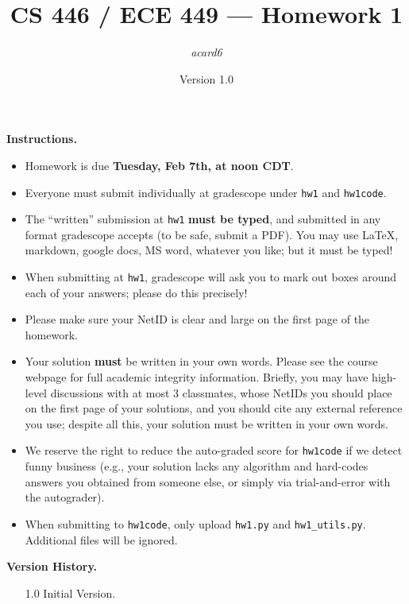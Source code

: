 \documentclass{article}
\title{CS 446 / ECE 449 --- Homework 1}
\author{\emph{acard6}}
\date{Version 1.0}
\theoremstyle{definition}
\theoremstyle{remark}
\begin{document}
        \maketitle

        \noindent\textbf{Instructions.}
        \begin{itemize}
          \item
            Homework is due \textbf{Tuesday, Feb 7th, at noon CDT}.
        
          \item
            Everyone must submit individually at gradescope under \texttt{hw1} and \texttt{hw1code}.
        
          \item
            The ``written'' submission at \texttt{hw1} \textbf{must be typed}, and submitted in
            any format gradescope accepts (to be safe, submit a PDF).  You may use \LaTeX, markdown,
            google docs, MS word, whatever you like; but it must be typed!
        
          \item
            When submitting at \texttt{hw1}, gradescope will ask you to mark out boxes
            around each of your answers; please do this precisely!
        
          \item
            Please make sure your NetID is clear and large on the first page of the homework.
        
          \item
            Your solution \textbf{must} be written in your own words.
            Please see the course webpage for full academic integrity information.
            Briefly, you may have high-level discussions with at most 3 classmates,
            whose NetIDs you should place on the first page of your solutions,
            and you should cite any external reference you use; despite all this,
            your solution must be written in your own words.
        
          \item
            We reserve the right to reduce the auto-graded score for
            \texttt{hw1code} if we detect funny business (e.g., your solution
            lacks any algorithm and hard-codes answers you obtained from
            someone else, or simply via trial-and-error with the autograder).
            
          \item
           When submitting to \texttt{hw1code}, only upload \texttt{hw1.py} and \texttt{hw1\_utils.py}. Additional files will be ignored.
        
        \end{itemize}
        \noindent\textbf{Version History.}
        \begin{enumerate}[leftmargin=3\parindent]
        	\item[1.0]
        	Initial Version. 
	\end{enumerate}
       
\end{document}
